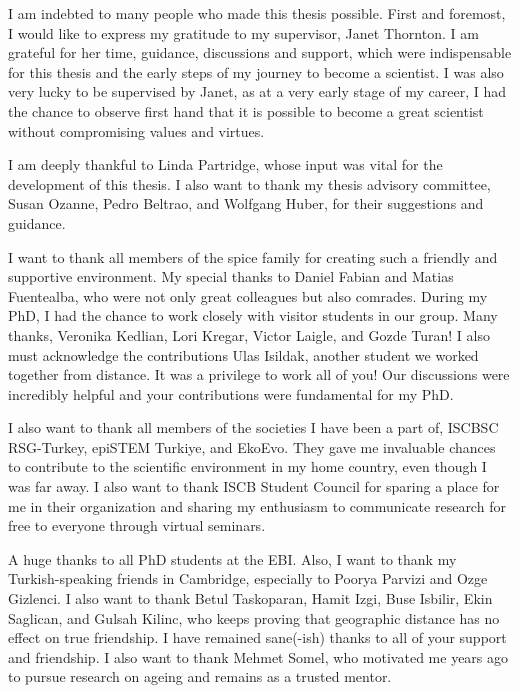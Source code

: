 \documentclass[12pt,twoside]{unicam}
\begin{document}
  \begin{acknowledgements}
    I am indebted to many people who made this thesis possible. First and foremost, I would like to express my gratitude to my supervisor, Janet Thornton. I am grateful for her time, guidance, discussions and support, which were indispensable for this thesis and the early steps of my journey to become a scientist. I was also very lucky to be supervised by Janet, as at a very early stage of my career, I had the chance to observe first hand that it is possible to become a great scientist without compromising values and virtues.

    \vspace{0.3cm}

    I am deeply thankful to Linda Partridge, whose input was vital for the development of this thesis. I also want to thank my thesis advisory committee, Susan Ozanne, Pedro Beltrao, and Wolfgang Huber, for their suggestions and guidance.

    \vspace{0.3cm}

    I want to thank all members of the spice family for creating such a friendly and supportive environment. My special thanks to Daniel Fabian and Matias Fuentealba, who were not only great colleagues but also comrades. During my PhD, I had the chance to work closely with visitor students in our group. Many thanks, Veronika Kedlian, Lori Kregar, Victor Laigle, and Gozde Turan! I also must acknowledge the contributions Ulas Isildak, another student we worked together from distance. It was a privilege to work all of you! Our discussions were incredibly helpful and your contributions were fundamental for my PhD.

    \vspace{0.3cm}

    I also want to thank all members of the societies I have been a part of, ISCBSC RSG-Turkey, epiSTEM Turkiye, and EkoEvo. They gave me invaluable chances to contribute to the scientific environment in my home country, even though I was far away. I also want to thank ISCB Student Council for sparing a place for me in their organization and sharing my enthusiasm to communicate research for free to everyone through virtual seminars.

    \vspace{0.3cm}

    A huge thanks to all PhD students at the EBI. Also, I want to thank my Turkish-speaking friends in Cambridge, especially to Poorya Parvizi and Ozge Gizlenci. I also want to thank Betul Taskoparan, Hamit Izgi, Buse Isbilir, Ekin Saglican, and Gulsah Kilinc, who keeps proving that geographic distance has no effect on true friendship. I have remained sane(-ish) thanks to all of your support and friendship. I also want to thank Mehmet Somel, who motivated me years ago to pursue research on ageing and remains as a trusted mentor.


\end{acknowledgements}
\end{document}
